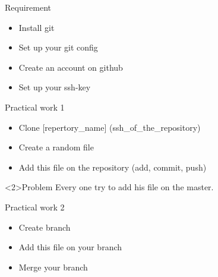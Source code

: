 \begin{frame}{Requirement}
    \begin{itemize}
        \item Install git
        \item Set up your git config
        \item Create an account on github
        \item Set up your ssh-key
    \end{itemize}
\end{frame}

\begin{frame}{Practical work 1}
    \begin{itemize}
        \item Clone [repertory\_name] (ssh\_of\_the\_repository)
        \item Create a random file
        \item Add this file on the repository (add, commit, push)
    \end{itemize}
    \begin{alertblock}<2>{Problem}
        Every one try to add his file on the master.
    \end{alertblock}
\end{frame}

\begin{frame}{Practical work 2}
    \begin{itemize}
        \item Create branch
        \item Add this file on your branch
        \item Merge your branch
    \end{itemize}
\end{frame}

